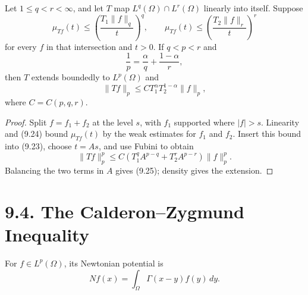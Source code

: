\begin{theorem}
\label{gt-ch09-thm-marcinkiewicz-interpolation}
Let $1\le q<r<\infty$, and let $T$ map
$L^q(\Omega)\cap L^r(\Omega)$ linearly into itself.  Suppose
\begin{equation}\tag{9.24}
\mu_{Tf}(t)\le\left(\frac{T_1\|f\|_q}{t}\right)^q,
\qquad
\mu_{Tf}(t)\le\left(\frac{T_2\|f\|_r}{t}\right)^r
\end{equation}
for every $f$ in that intersection and $t>0$.  If $q<p<r$ and
\[
\frac1p=\frac\alpha q+\frac{1-\alpha}r,
\]
then $T$ extends boundedly to $L^p(\Omega)$ and
\begin{equation}\tag{9.25}
\|Tf\|_p\le C T_1^\alpha T_2^{1-\alpha}\|f\|_p,
\end{equation}
where $C=C(p,q,r)$.
\end{theorem}
\begin{proof}
\sketch Split $f=f_1+f_2$ at the level $s$, with $f_1$ supported where
$|f|>s$.  Linearity and (9.24) bound $\mu_{Tf}(t)$ by the weak estimates for
$f_1$ and $f_2$.  Insert this bound into (9.23), choose $t=As$, and use
Fubini to obtain
\[
\|Tf\|_p^p\le C\left(T_1^qA^{p-q}+T_2^rA^{p-r}\right)\|f\|_p^p.
\]
Balancing the two terms in $A$ gives (9.25); density gives the extension.
\end{proof}

\section*{9.4. The Calderon--Zygmund Inequality}

For $f\in L^p(\Omega)$, its Newtonian potential is
\begin{equation}\tag{9.26}
Nf(x)=\int_\Omega\Gamma(x-y)f(y)\,dy.
\end{equation}

